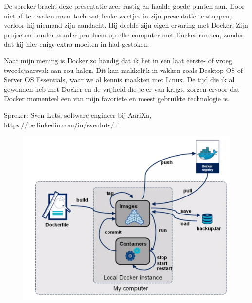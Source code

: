 De spreker bracht deze presentatie zeer rustig en haalde goede punten aan. Door niet af te dwalen maar toch wat leuke weetjes in zijn presentatie te stoppen, verloor hij niemand zijn aandacht. Hij deelde zijn eigen ervaring met Docker. Zijn projecten konden zonder probleem op elke computer met Docker runnen, zonder dat hij hier enige extra moeiten in had gestoken.

Naar mijn mening is Docker zo handig dat ik het in een laat eerste\hyp{} of vroeg tweedejaarsvak aan zou halen. Dit kan makkelijk in vakken zoals Desktop OS of Server OS Essentials, waar we al kennis maakten met Linux. De tijd die ik al gewonnen heb met Docker en de vrijheid die je er van krijgt, zorgen ervoor dat Docker momenteel een van mijn favoriete en meest gebruikte technologie is.

Spreker: Sven Luts, software engineer bij AariXa, \url{https://be.linkedin.com/in/svenluts/nl}


\begin{figure}[!h]
  \centering
  \includegraphics[width=0.74\linewidth]{images/docker/flow.png}
\end{figure}